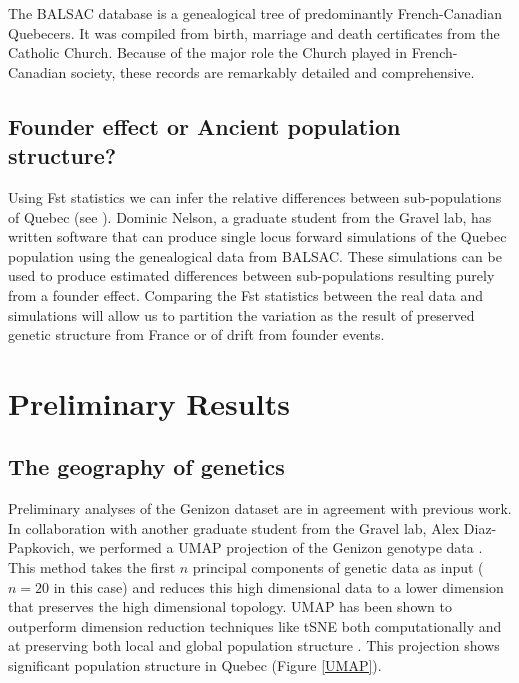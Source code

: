 \documentclass[
11pt, %
oneside, %
english, %
doublespacing, %
headsepline, %
chapterinoneline, %
]{MastersDoctoralThesis} %
\begin{document}
The BALSAC database is a genealogical tree of predominantly French-Canadian Quebecers.
It was compiled from birth, marriage and death certificates from the Catholic Church.
Because of the major role the Church played in French-Canadian society, these records are remarkably detailed and comprehensive.

\subsection{Founder effect or Ancient population structure?}
Using Fst statistics we can infer the relative differences between sub-populations of Quebec (see \citep{Roy-Gagnon2011}).
Dominic Nelson, a graduate student from the Gravel lab, has written software that can produce single locus forward simulations of the Quebec population using the genealogical data from BALSAC.
These simulations can be used to produce estimated differences between sub-populations resulting purely from a founder effect.
Comparing the Fst statistics between the real data and simulations will allow us to partition the variation as the result of preserved genetic structure from France or of drift from founder events.

\section{Preliminary Results}

\subsection{The geography of genetics}

Preliminary analyses of the Genizon dataset are in agreement with previous work.
In collaboration with another graduate student from the Gravel lab, Alex Diaz-Papkovich, we performed a UMAP projection of the Genizon genotype data \citep{mcinnes2018umap,diaz2018}.
This method takes the first $n$ principal components of genetic data as input ($n = 20$ in this case) and reduces this high dimensional data to a lower dimension that preserves the high dimensional topology.
UMAP has been shown to outperform dimension reduction techniques like tSNE both computationally and at preserving both local and global population structure \citep{diaz2018, mcinnes2018umap}.
This projection shows significant population structure in Quebec (Figure \ref{UMAP}). 
\end{document}
